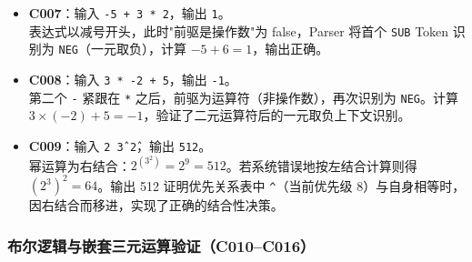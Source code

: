 \documentclass[a4paper]{article}
\begin{document}
\begin{itemize}
    \item \textbf{C007}：输入 \texttt{-5 + 3 * 2}，输出 \texttt{1}。\\
    表达式以减号开头，此时"前驱是操作数"为 false，Parser 将首个 \texttt{SUB} Token 识别为 \texttt{NEG}（一元取负），计算 $-5 + 6 = 1$，输出正确。
    
    \item \textbf{C008}：输入 \texttt{3 * -2 + 5}，输出 \texttt{-1}。\\
    第二个 \texttt{-} 紧跟在 \texttt{*} 之后，前驱为运算符（非操作数），再次识别为 \texttt{NEG}。计算 $3\times(-2) + 5 = -1$，验证了二元运算符后的一元取负上下文识别。
    
    \item \textbf{C009}：输入 \texttt{2 \^ 3 \^ 2}，输出 \texttt{512}。\\
    幂运算为右结合：$2^{(3^2)} = 2^9 = 512$。若系统错误地按左结合计算则得 $(2^3)^2 = 64$。输出 512 证明优先关系表中 \texttt{\^}（当前优先级 8）与自身相等时，因右结合而移进，实现了正确的结合性决策。
\end{itemize}

\subsubsection{布尔逻辑与嵌套三元运算验证（C010--C016）}
\end{document}
